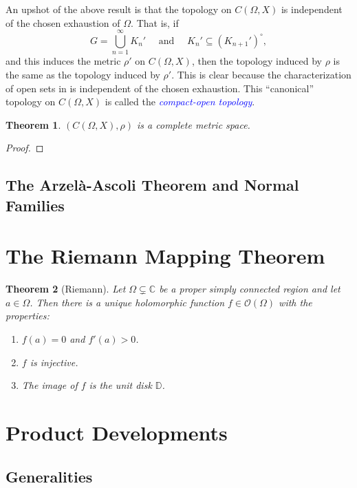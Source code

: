\documentclass[11pt]{article}
\theoremstyle{thmstyle}
\newtheorem{theorem}{Theorem}[section]
\theoremstyle{defstyle}
\newcommand{\bbC}{\mathbb{C}}
\newcommand{\bbD}{\mathbb{D}} %
\newcommand{\scrO}{\mathscr{O}} %
\newcommand{\define}[1]{\textcolor{blue}{\textit{#1}}}
\begin{document}
An upshot of the above result is that the topology on $C(\Omega, X)$ is independent of the chosen exhaustion of $\Omega$. That is, if 
\begin{equation*}
    G = \bigcup_{n = 1}^\infty K_n'\quad\text{ and }\quad K_n'\subseteq \left(K_{n + 1}'\right)^\circ,
\end{equation*}
and this induces the metric $\rho'$ on $C(\Omega, X)$, then the topology induced by $\rho$ is the same as the topology induced by $\rho'$. This is clear because the characterization of open sets in  is independent of the chosen exhaustion. This ``canonical'' topology on $C(\Omega, X)$ is called the \define{compact-open topology}.

\begin{theorem}
    $\left(C(\Omega, X),\rho\right)$ is a complete metric space.
\end{theorem}
\begin{proof}
\end{proof}


\subsection{The Arzel\`a-Ascoli Theorem and Normal Families}


\section{The Riemann Mapping Theorem}

\begin{theorem}[Riemann]
    Let $\Omega\subsetneq\bbC$ be a proper simply connected region and let $a\in\Omega$. Then there is a unique holomorphic function $f\in\scrO(\Omega)$ with the properties: 
    \begin{enumerate}[label=(\roman*)]
        \item $f(a) = 0$ and $f'(a) > 0$. 
        \item $f$ is injective.
        \item The image of $f$ is the unit disk $\bbD$.
    \end{enumerate}
\end{theorem}

\section{Product Developments}

\subsection{Generalities}
\end{document}
